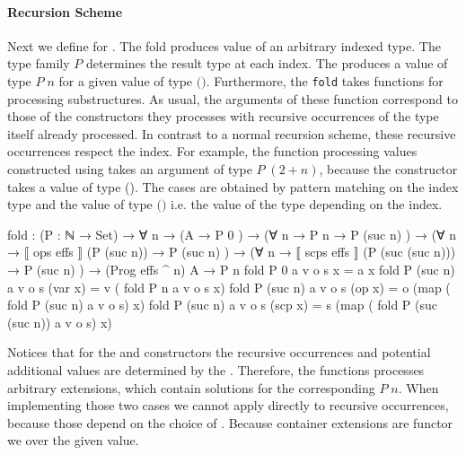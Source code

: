 \paragraph{Recursion Scheme} Next we define  for
\AgdaSpace{}\AgdaSpace{}.
The fold produces value of an arbitrary  indexed type.
The type family $P$ determines the result type at each index.
The  produces a value of type $P\;n$ for a given value of
type
$($\AgdaSpace{}\AgdaSpace{}\AgdaFunction{\textasciicircum}\AgdaSpace{}$)$\AgdaSpace{}.
Furthermore, the \texttt{fold} takes functions for processing substructures.
As usual, the arguments of these function correspond to those of the
constructors they processes with recursive occurrences of the type itself already
processed.
In contrast to a normal recursion scheme, these recursive occurrences respect
the index.
For example, the function processing values constructed using
 takes an argument of type $P\;(2 + n)$, because
the constructor takes a value of type 
\AgdaSpace{}\AgdaSpace{}(\AgdaSpace{}\AgdaSpace{}).
The cases are obtained by pattern matching on the index type and the value of
type
$($\AgdaSpace{}\AgdaSpace{}\AgdaFunction{\textasciicircum}\AgdaSpace{}$)$\AgdaSpace{}
i.e. the value of the type depending on the index.

\begin{code}
fold : (P : ℕ → Set) → ∀ n →
  (A                                           → P 0        )  →
  (∀ {n} → P n                                 → P (suc n)  )  →
  (∀ {n} → ⟦ ops   effs  ⟧  (P (suc n))        → P (suc n)  )  →
  (∀ {n} → ⟦ scps  effs  ⟧  (P (suc (suc n)))  → P (suc n)  )  →
  (Prog effs ^ n) A → P n
fold P 0        a v o s x         = a  x
fold P (suc n)  a v o s (var  x)  = v  (       fold P n              a v o s   x)
fold P (suc n)  a v o s (op   x)  = o  (map (  fold P (suc n)        a v o s)  x)
fold P (suc n)  a v o s (scp  x)  = s  (map (  fold P (suc (suc n))  a v o s)  x)
\end{code}
Notices that for the  and
 constructors the recursive occurrences and
potential additional values are determined by the .
Therefore, the functions processes arbitrary  extensions,
which contain solutions for the corresponding $P\;n$.
When implementing those two cases we cannot apply  directly
to recursive occurrences, because those depend on the choice of
.
Because container extensions are functor we  over the given
value.


